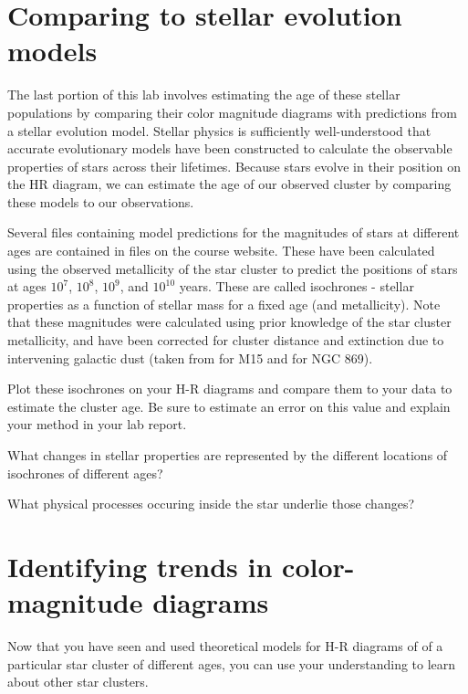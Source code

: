 \section{Comparing to stellar evolution models}

The last portion of this lab involves estimating the age of these stellar populations by comparing their color magnitude diagrams with predictions from a stellar evolution model. Stellar physics is sufficiently well-understood that accurate evolutionary models have been constructed to calculate the observable properties of stars across their lifetimes. Because stars evolve in their position on the HR diagram, we can estimate the age of our observed cluster by comparing these models to our observations.

Several files containing model predictions for the magnitudes of stars at different ages are contained in files on the course website. These have been calculated using the observed metallicity of the star cluster to predict the positions of stars at ages $10^7$, $10^8$, $10^9$, and $10^{10}$ years. These are called isochrones - stellar properties as a function of stellar mass for a fixed age (and metallicity). Note that these magnitudes were calculated using prior knowledge of the star cluster metallicity, and have been corrected for cluster distance and extinction due to intervening galactic dust (taken from \cite{DurrellHarris1993} for M15 and \cite{Currie2010} for NGC 869).

\begin{steps}
	\item Plot these isochrones on your H-R diagrams and compare them to your data to estimate the cluster age. Be sure to estimate an error on this value and explain your method in your lab report.
	
	\item What changes in stellar properties are represented by the different locations of isochrones of different ages?
	
	\item What physical processes occuring inside the star underlie those changes?
\end{steps}

\section{Identifying trends in color-magnitude diagrams}

Now that you have seen and used theoretical models for H-R diagrams of of a particular star cluster of different ages, you can use your understanding to learn about other star clusters.

